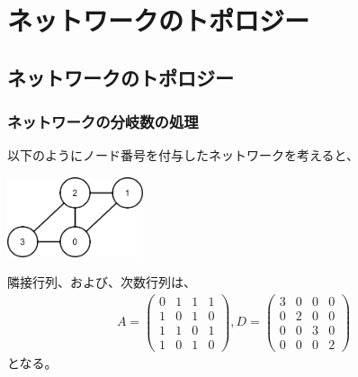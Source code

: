 \documentclass[11pt, dvipdfmx]{beamer}
\begin{document}
\section{ネットワークのトポロジー}
\subsection{ネットワークのトポロジー}

\begin{frame}
\frametitle{ネットワークの分岐数の処理}
以下のようにノード番号を付与したネットワークを考えると、
\begin{center}
\includegraphics[width=4cm]{./fig/NW-4.png}
\end{center}
隣接行列、および、次数行列は、
\begin{align*}
A = \left( 
\begin{array}{cccc} 
0 & 1 & 1 & 1 \\ 
1 & 0 & 1 & 0 \\
1 & 1 & 0 & 1 \\
1 & 0 & 1 & 0 
\end{array} 
\right) 
,
D = \left( 
\begin{array}{cccc} 
3 & 0 & 0 & 0 \\ 
0 & 2 & 0 & 0 \\
0 & 0 & 3 & 0 \\
0 & 0 & 0 & 2 
\end{array} 
\right) 
\end{align*}
となる。
\end{frame}
\end{document}
